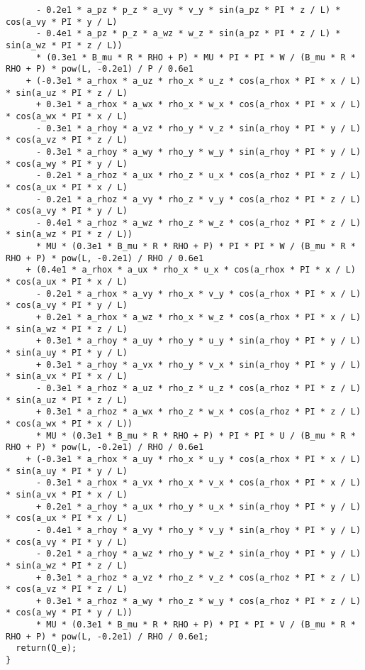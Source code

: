 \documentclass[10pt]{article}
\begin{document}
\begin{small}
\begin{verbatim}
      - 0.2e1 * a_pz * p_z * a_vy * v_y * sin(a_pz * PI * z / L) * cos(a_vy * PI * y / L)
      - 0.4e1 * a_pz * p_z * a_wz * w_z * sin(a_pz * PI * z / L) * sin(a_wz * PI * z / L))
      * (0.3e1 * B_mu * R * RHO + P) * MU * PI * PI * W / (B_mu * R * RHO + P) * pow(L, -0.2e1) / P / 0.6e1
    + (-0.3e1 * a_rhox * a_uz * rho_x * u_z * cos(a_rhox * PI * x / L) * sin(a_uz * PI * z / L)
      + 0.3e1 * a_rhox * a_wx * rho_x * w_x * cos(a_rhox * PI * x / L) * cos(a_wx * PI * x / L)
      - 0.3e1 * a_rhoy * a_vz * rho_y * v_z * sin(a_rhoy * PI * y / L) * cos(a_vz * PI * z / L)
      - 0.3e1 * a_rhoy * a_wy * rho_y * w_y * sin(a_rhoy * PI * y / L) * cos(a_wy * PI * y / L)
      - 0.2e1 * a_rhoz * a_ux * rho_z * u_x * cos(a_rhoz * PI * z / L) * cos(a_ux * PI * x / L)
      - 0.2e1 * a_rhoz * a_vy * rho_z * v_y * cos(a_rhoz * PI * z / L) * cos(a_vy * PI * y / L)
      - 0.4e1 * a_rhoz * a_wz * rho_z * w_z * cos(a_rhoz * PI * z / L) * sin(a_wz * PI * z / L))
      * MU * (0.3e1 * B_mu * R * RHO + P) * PI * PI * W / (B_mu * R * RHO + P) * pow(L, -0.2e1) / RHO / 0.6e1
    + (0.4e1 * a_rhox * a_ux * rho_x * u_x * cos(a_rhox * PI * x / L) * cos(a_ux * PI * x / L)
      - 0.2e1 * a_rhox * a_vy * rho_x * v_y * cos(a_rhox * PI * x / L) * cos(a_vy * PI * y / L)
      + 0.2e1 * a_rhox * a_wz * rho_x * w_z * cos(a_rhox * PI * x / L) * sin(a_wz * PI * z / L)
      + 0.3e1 * a_rhoy * a_uy * rho_y * u_y * sin(a_rhoy * PI * y / L) * sin(a_uy * PI * y / L)
      + 0.3e1 * a_rhoy * a_vx * rho_y * v_x * sin(a_rhoy * PI * y / L) * sin(a_vx * PI * x / L)
      - 0.3e1 * a_rhoz * a_uz * rho_z * u_z * cos(a_rhoz * PI * z / L) * sin(a_uz * PI * z / L)
      + 0.3e1 * a_rhoz * a_wx * rho_z * w_x * cos(a_rhoz * PI * z / L) * cos(a_wx * PI * x / L))
      * MU * (0.3e1 * B_mu * R * RHO + P) * PI * PI * U / (B_mu * R * RHO + P) * pow(L, -0.2e1) / RHO / 0.6e1
    + (-0.3e1 * a_rhox * a_uy * rho_x * u_y * cos(a_rhox * PI * x / L) * sin(a_uy * PI * y / L)
      - 0.3e1 * a_rhox * a_vx * rho_x * v_x * cos(a_rhox * PI * x / L) * sin(a_vx * PI * x / L)
      + 0.2e1 * a_rhoy * a_ux * rho_y * u_x * sin(a_rhoy * PI * y / L) * cos(a_ux * PI * x / L)
      - 0.4e1 * a_rhoy * a_vy * rho_y * v_y * sin(a_rhoy * PI * y / L) * cos(a_vy * PI * y / L)
      - 0.2e1 * a_rhoy * a_wz * rho_y * w_z * sin(a_rhoy * PI * y / L) * sin(a_wz * PI * z / L)
      + 0.3e1 * a_rhoz * a_vz * rho_z * v_z * cos(a_rhoz * PI * z / L) * cos(a_vz * PI * z / L)
      + 0.3e1 * a_rhoz * a_wy * rho_z * w_y * cos(a_rhoz * PI * z / L) * cos(a_wy * PI * y / L))
      * MU * (0.3e1 * B_mu * R * RHO + P) * PI * PI * V / (B_mu * R * RHO + P) * pow(L, -0.2e1) / RHO / 0.6e1;
  return(Q_e);
}
\end{verbatim}
\end{small}
 

\end{document}
